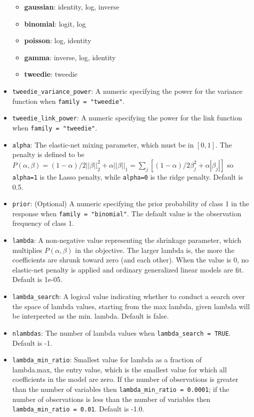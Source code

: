 \begin{itemize}
	\begin{itemize}
\item	{\textbf {gaussian}}: identity, log, inverse 
\item {\textbf{binomial}}: logit, log 
\item {\textbf{poisson}}: log, identity
\item {\textbf{gamma}}: inverse, log, identity
\item {\textbf{tweedie}}: tweedie 
	\end{itemize}
\item \texttt{tweedie\_variance\_power}: A numeric specifying the power for the variance function when \texttt{family = "tweedie"}. 
\item \texttt{tweedie\_link\_power}: A numeric specifying the power for the link function when \texttt{family = "tweedie"}. 
\item \texttt{alpha}: The elastic-net mixing parameter, which must be in $[0,1]$. The penalty is defined to be $P(\alpha,\beta) = (1-\alpha)/2||\beta||_2^2 + \alpha||\beta||_1 = \sum_j [(1-\alpha)/2 \beta_j^2 + \alpha|\beta_j|] $ so \texttt{alpha=1} is the Lasso penalty, while \texttt{alpha=0} is the ridge penalty. Default is 0.5.
\item \texttt{prior}: (Optional) A numeric specifying the prior probability of class 1 in the response when \texttt{family = "binomial"}. The default value is the observation frequency of class 1. 
\item \texttt{lambda}: A non-negative value representing the shrinkage parameter, which multiplies $P(\alpha,\beta)$ in the objective. The larger lambda is, the more the coefficients are shrunk toward zero (and each other). When the value is 0, no elastic-net penalty is applied and ordinary generalized linear models are fit. Default is 1e-05.
\item \texttt{lambda\_search}: A logical value indicating whether to conduct a search over the space of lambda values, starting from the max lambda, given lambda will be interpreted as the min. lambda. Default is false.
\item \texttt{nlambdas}: The number of lambda values when \texttt{lambda\_search = TRUE}. Default is -1.
\item \texttt{lambda\_min\_ratio}: Smallest value for lambda as a fraction of \\ lambda.max, the entry value, which is the smallest value for which all coefficients in the model are zero. If the number of observations is greater than the number of variables then \texttt{lambda\_min\_ratio = 0.0001}; if the number of observations is less than the number of variables then \texttt{lambda\_min\_ratio = 0.01}. Default is -1.0.

\end{itemize}

